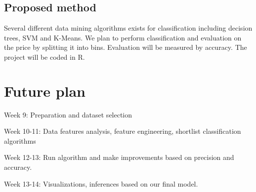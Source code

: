 \documentclass{sig-alternate}
\begin{document}
	\subsection{Proposed method}
	Several different data mining algorithms exists for classification including decision trees, SVM and K-Means. We plan to perform classification and evaluation on the price by splitting it into bins. 
	Evaluation will be measured by accuracy. The project will be coded in R. 
	
	\section{Future plan}
	Week 9: Preparation and dataset selection
	
	Week 10-11: Data features analysis, feature engineering, shortlist classification algorithms
	
	Week 12-13: Run algorithm and make improvements based on precision and accuracy.
	
	Week 13-14: Visualizations, inferences based on our final model.
	
\end{document}
